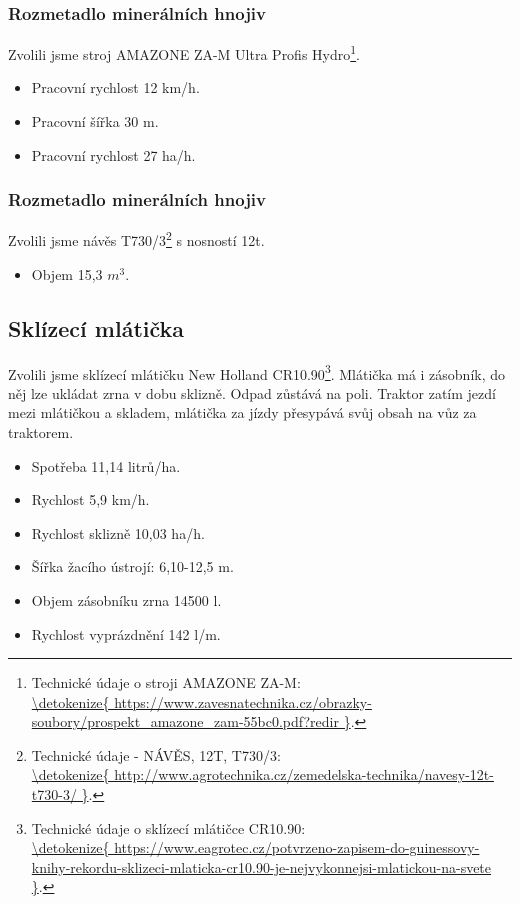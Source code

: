\subsubsection{Rozmetadlo minerálních hnojiv}
Zvolili jsme stroj AMAZONE ZA-M Ultra Profis Hydro\footnote{Technické údaje o stroji AMAZONE ZA-M: \\\url{\detokenize{
https://www.zavesnatechnika.cz/obrazky-soubory/prospekt_amazone_zam-55bc0.pdf?redir
}}.}.
\begin{itemize}
  \item Pracovní rychlost 12 km/h.
  \item Pracovní šířka 30 m.
  \item Pracovní rychlost 27 ha/h.
\end{itemize}

\subsubsection{Rozmetadlo minerálních hnojiv}
Zvolili jsme návěs T730/3\footnote{Technické údaje - NÁVĚS, 12T, T730/3: \\\url{\detokenize{
http://www.agrotechnika.cz/zemedelska-technika/navesy-12t-t730-3/
}}.}  s nosností 12t.
\begin{itemize}
  \item Objem 15,3 $m^3$.
\end{itemize}

\subsection{Sklízecí mlátička}
Zvolili jsme sklízecí mlátičku New Holland CR10.90\footnote{Technické údaje o sklízecí mlátičce CR10.90: \\\url{\detokenize{
https://www.eagrotec.cz/potvrzeno-zapisem-do-guinessovy-knihy-rekordu-sklizeci-mlaticka-cr10.90-je-nejvykonnejsi-mlatickou-na-svete
}}.}. Mlátička má i zásobník, do něj lze ukládat zrna v dobu sklizně. Odpad zůstává na poli.
Traktor zatím jezdí mezi mlátičkou a skladem, mlátička za jízdy přesypává svůj obsah na vůz za traktorem.
\begin{itemize}
  \item Spotřeba 11,14 litrů/ha.
  \item Rychlost 5,9 km/h.
  \item Rychlost sklizně 10,03 ha/h.
  \item Šířka žacího ústrojí: 6,10-12,5 m.
  \item Objem zásobníku zrna 14500 l.
  \item Rychlost vyprázdnění 142 l/m.
\end{itemize}